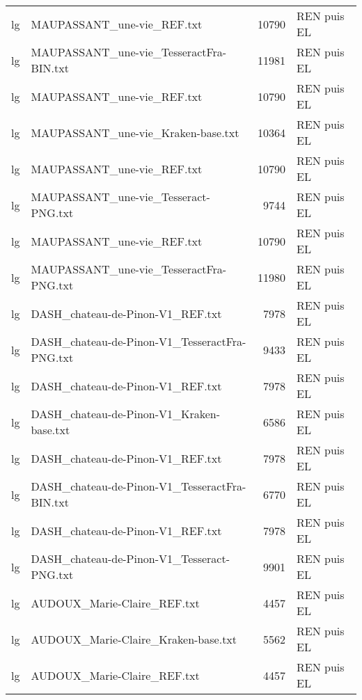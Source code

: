 \begin{tabular}{llrl}
    lg &                         MAUPASSANT\_une-vie\_REF.txt &                 10790 & REN puis EL \\
    lg &            MAUPASSANT\_une-vie\_TesseractFra-BIN.txt &                 11981 & REN puis EL \\
    lg &                         MAUPASSANT\_une-vie\_REF.txt &                 10790 & REN puis EL \\
    lg &                 MAUPASSANT\_une-vie\_Kraken-base.txt &                 10364 & REN puis EL \\
    lg &                         MAUPASSANT\_une-vie\_REF.txt &                 10790 & REN puis EL \\
    lg &               MAUPASSANT\_une-vie\_Tesseract-PNG.txt &                  9744 & REN puis EL \\
    lg &                         MAUPASSANT\_une-vie\_REF.txt &                 10790 & REN puis EL \\
    lg &            MAUPASSANT\_une-vie\_TesseractFra-PNG.txt &                 11980 & REN puis EL \\
    lg &                   DASH\_chateau-de-Pinon-V1\_REF.txt &                  7978 & REN puis EL \\
    lg &      DASH\_chateau-de-Pinon-V1\_TesseractFra-PNG.txt &                  9433 & REN puis EL \\
    lg &                   DASH\_chateau-de-Pinon-V1\_REF.txt &                  7978 & REN puis EL \\
    lg &           DASH\_chateau-de-Pinon-V1\_Kraken-base.txt &                  6586 & REN puis EL \\
    lg &                   DASH\_chateau-de-Pinon-V1\_REF.txt &                  7978 & REN puis EL \\
    lg &      DASH\_chateau-de-Pinon-V1\_TesseractFra-BIN.txt &                  6770 & REN puis EL \\
    lg &                   DASH\_chateau-de-Pinon-V1\_REF.txt &                  7978 & REN puis EL \\
    lg &         DASH\_chateau-de-Pinon-V1\_Tesseract-PNG.txt &                  9901 & REN puis EL \\
    lg &                        AUDOUX\_Marie-Claire\_REF.txt &                  4457 & REN puis EL \\
    lg &                AUDOUX\_Marie-Claire\_Kraken-base.txt &                  5562 & REN puis EL \\
    lg &                        AUDOUX\_Marie-Claire\_REF.txt &                  4457 & REN puis EL \\

\end{tabular}
